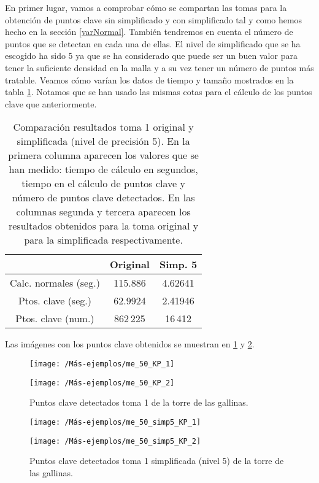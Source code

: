 En primer lugar, vamos a comprobar cómo se compartan las tomas para la obtención de puntos clave sin simplificado y con simplificado tal y como hemos hecho en la sección \ref{varNormal}. También tendremos en cuenta el número de puntos que se detectan en cada una de ellas. El nivel de simplificado que se ha escogido ha sido 5 ya que se ha considerado que puede ser un buen valor para tener la suficiente densidad en la malla y a su vez tener un número de puntos más tratable. Veamos cómo varían los datos de tiempo y tamaño mostrados en la tabla \ref{table:me-normal}. Notamos que se han usado las mismas cotas para el cálculo de los puntos clave que anteriormente.

\begin{table}[h!]
	\centering
	\begin{tabular}{| c | c | c |} 
		\hline
		& Original  & Simp. 5 \\
		\hline
		Calc. normales (seg.) & 115.886  &  4.62641\\			 
		Ptos. clave (seg.) & 62.9924 & 2.41946\\
		Ptos. clave (num.) & 862\,225 & 16\,412\\
		\hline
	\end{tabular}
	\caption{Comparación resultados toma 1 original y simplificada (nivel de precisión 5). En la primera columna aparecen los valores que se han medido: tiempo de cálculo en segundos, tiempo en el cálculo de puntos clave y número de puntos clave detectados. En las columnas segunda y tercera aparecen los resultados obtenidos para la toma original y para la simplificada respectivamente.}
	\label{table:me-normal}
\end{table}

Las imágenes con los puntos clave obtenidos se muestran en \ref{me_50_KP} y \ref{me_50_KP_simp4}. 

\begin{figure}[h!]	
	\begin{minipage}[b]{0.5\textwidth}
		\centering		
		\texttt{[image: /Más-ejemplos/me\_50\_KP\_1]} 
	\end{minipage}
	\begin{minipage}[b]{0.5\textwidth}
		\centering
		\texttt{[image: /Más-ejemplos/me\_50\_KP\_2]}
	\end{minipage}
	\caption{Puntos clave detectados toma 1 de la torre de las gallinas.}
	\label{me_50_KP}
\end{figure}
\begin{figure}[h!]	
	\begin{minipage}{0.5\textwidth}
		\centering		
		\texttt{[image: /Más-ejemplos/me\_50\_simp5\_KP\_1]} 
	\end{minipage}
	\begin{minipage}{0.5\textwidth}
		\centering
		\texttt{[image: /Más-ejemplos/me\_50\_simp5\_KP\_2]}
	\end{minipage}
	\caption{Puntos clave detectados toma 1 simplificada (nivel 5) de la torre de las gallinas.}
	\label{me_50_KP_simp4}
\end{figure}

